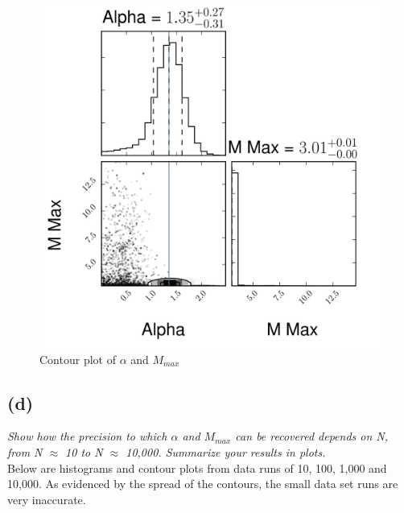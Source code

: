 \documentclass[english,11pt]{article}
\begin{document}
\begin{figure}[H]
\centering
\caption{Contour plot of  $\alpha$ and $M_{max}$ }
\includegraphics[scale = 0.6]{corner_plot_emcee_prob2_1000_data.png}
\end{figure}

\subsection*{(d)}
\textit{Show how the precision to which $\alpha$ and $M_{max}$ can be recovered depends on N, from N $\approx$ 10 to N $\approx$ 10,000. Summarize your results in plots.}\\
Below are histograms and contour plots from data runs of 10, 100, 1,000 and 10,000. As evidenced by the spread of the contours, the small data set runs are very inaccurate.

\end{document}
